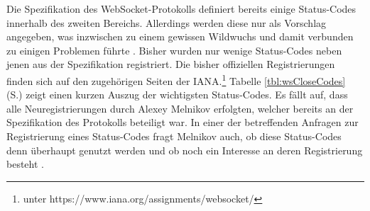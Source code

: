 \documentclass[11pt,a4paper,titlepage]{scrartcl}
\numberwithin{equation}{section}
\begin{document}
\noindent Die Spezifikation des WebSocket-Protokolls definiert bereits einige Status-Codes innerhalb des zweiten Bereichs. Allerdings werden diese nur als Vorschlag angegeben, was inzwischen zu einem gewissen Wildwuchs und damit verbunden zu einigen Problemen führte \autocite[53]{gorski_websockets_2015}. Bisher wurden nur wenige Status-Codes neben jenen aus der Spezifikation registriert. Die bisher offiziellen Registrierungen finden sich auf den zugehörigen Seiten der IANA.\footnote{unter https://www.iana.org/assignments/websocket/} Tabelle \ref{tbl:wsCloseCodes} (S.\pageref{tbl:wsCloseCodes}) zeigt einen kurzen Auszug der wichtigsten Status-Codes. Es fällt auf, dass alle Neuregistrierungen durch Alexey Melnikov erfolgten, welcher bereits an der Spezifikation des Protokolls beteiligt war. In einer der betreffenden Anfragen zur Registrierung eines Status-Codes fragt Melnikov auch, ob diese Status-Codes denn überhaupt genutzt werden und ob noch ein Interesse an deren Registrierung besteht \autocite{melnikov_additional_2012}.
\end{document}
